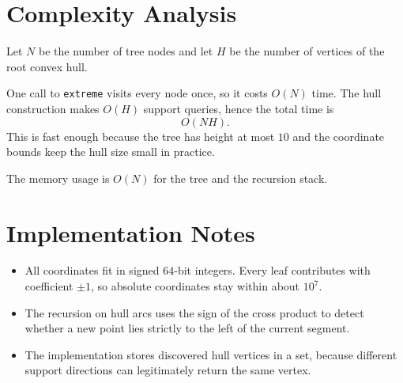 \documentclass[11pt]{article}
\begin{document}
\section*{Complexity Analysis}

Let $N$ be the number of tree nodes and let $H$ be the number of vertices of the root convex hull.

One call to \texttt{extreme} visits every node once, so it costs $O(N)$ time. The hull construction makes
$O(H)$ support queries, hence the total time is
\[
    O(NH).
\]
This is fast enough because the tree has height at most $10$ and the coordinate bounds keep the hull size
small in practice.

The memory usage is $O(N)$ for the tree and the recursion stack.

\section*{Implementation Notes}

\begin{itemize}[leftmargin=*]
    \item All coordinates fit in signed $64$-bit integers. Every leaf contributes with coefficient $\pm 1$, so
    absolute coordinates stay within about $10^7$.
    \item The recursion on hull arcs uses the sign of the cross product to detect whether a new point lies
    strictly to the left of the current segment.
    \item The implementation stores discovered hull vertices in a set, because different support directions
    can legitimately return the same vertex.
\end{itemize}
\end{document}
